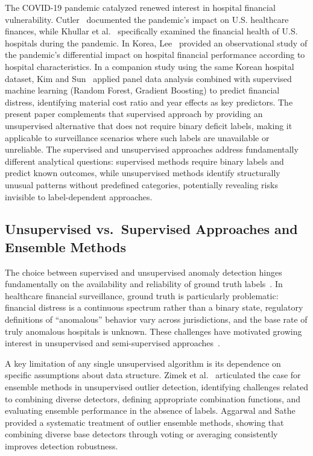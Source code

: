 \documentclass{ieeeaccess}
\begin{document}
The COVID-19 pandemic catalyzed renewed interest in hospital financial vulnerability. Cutler~\cite{cutler2020impact} documented the pandemic's impact on U.S. healthcare finances, while Khullar et al.~\cite{khullar2020covid} specifically examined the financial health of U.S. hospitals during the pandemic. In Korea, Lee~\cite{lee2024covid} provided an observational study of the pandemic's differential impact on hospital financial performance according to hospital characteristics. In a companion study using the same Korean hospital dataset, Kim and Sun~\cite{kim2024financial} applied panel data analysis combined with supervised machine learning (Random Forest, Gradient Boosting) to predict financial distress, identifying material cost ratio and year effects as key predictors. The present paper complements that supervised approach by providing an unsupervised alternative that does not require binary deficit labels, making it applicable to surveillance scenarios where such labels are unavailable or unreliable. The supervised and unsupervised approaches address fundamentally different analytical questions: supervised methods require binary labels and predict known outcomes, while unsupervised methods identify structurally unusual patterns without predefined categories, potentially revealing risks invisible to label-dependent approaches.

\subsection{Unsupervised vs.\ Supervised Approaches and Ensemble Methods}
\label{subsec:unsupervised_vs_supervised}
The choice between supervised and unsupervised anomaly detection hinges fundamentally on the availability and reliability of ground truth labels~\cite{chandola2009anomaly}. In healthcare financial surveillance, ground truth is particularly problematic: financial distress is a continuous spectrum rather than a binary state, regulatory definitions of ``anomalous'' behavior vary across jurisdictions, and the base rate of truly anomalous hospitals is unknown. These challenges have motivated growing interest in unsupervised and semi-supervised approaches~\cite{ruff2021unifying}.

A key limitation of any single unsupervised algorithm is its dependence on specific assumptions about data structure. Zimek et al.~\cite{zimek2014ensembles} articulated the case for ensemble methods in unsupervised outlier detection, identifying challenges related to combining diverse detectors, defining appropriate combination functions, and evaluating ensemble performance in the absence of labels. Aggarwal and Sathe~\cite{aggarwal2017outlier_ensembles} provided a systematic treatment of outlier ensemble methods, showing that combining diverse base detectors through voting or averaging consistently improves detection robustness.
\end{document}
